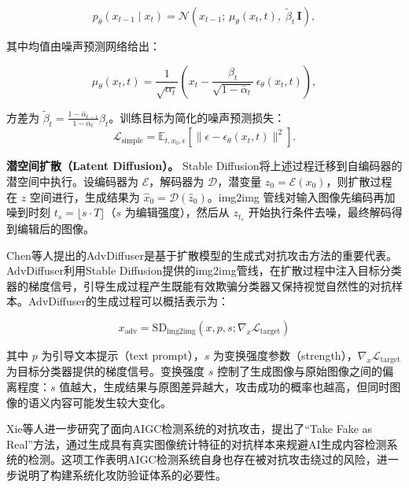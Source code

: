 \documentclass[type=bachelor,oneside]{fduthesis}
\begin{document}
\begin{equation}
  p_\theta(x_{t-1} \mid x_t) = \mathcal{N}\!\left(x_{t-1};\, \mu_\theta(x_t,t),\; \tilde{\beta}_t\, \mathbf{I}\right),
  \label{eq:ddpm_reverse}
\end{equation}

其中均值由噪声预测网络给出：

\begin{equation}
  \mu_\theta(x_t,t)=\frac{1}{\sqrt{\alpha_t}}\!\left(x_t - \frac{\beta_t}{\sqrt{1-\bar{\alpha}_t}}\,\epsilon_\theta(x_t,t)\right),
  \label{eq:ddpm_reverse_mean}
\end{equation}

方差为 $\tilde{\beta}_t = \frac{1-\bar{\alpha}_{t-1}}{1-\bar{\alpha}_t}\beta_t$。训练目标为简化的噪声预测损失：
\begin{equation}
  \mathcal{L}_{\text{simple}} = \mathbb{E}_{t,x_0,\epsilon}\!\left[\|\epsilon - \epsilon_\theta(x_t,t)\|^2\right].
\end{equation}

\textbf{潜空间扩散（Latent Diffusion）。} Stable Diffusion\cite{rombach2022highresolution}将上述过程迁移到自编码器的潜空间中执行。设编码器为 $\mathcal{E}$，解码器为 $\mathcal{D}$，潜变量 $z_0=\mathcal{E}(x_0)$，则扩散过程在 $z$ 空间进行，生成结果为 $\hat{x}_0 = \mathcal{D}(\hat{z}_0)$。img2img 管线对输入图像先编码再加噪到时刻 $t_s=\lfloor s\cdot T\rfloor$（$s$ 为编辑强度），然后从 $z_{t_s}$ 开始执行条件去噪，最终解码得到编辑后的图像。

Chen等人\cite{chen2023advdiffuser}提出的AdvDiffuser是基于扩散模型的生成式对抗攻击方法的重要代表。AdvDiffuser利用Stable Diffusion\cite{rombach2022highresolution}提供的img2img管线，在扩散过程中注入目标分类器的梯度信号，引导生成过程产生既能有效欺骗分类器又保持视觉自然性的对抗样本。AdvDiffuser的生成过程可以概括表示为：

\begin{equation}
  x_{\text{adv}} = \text{SD}_{\text{img2img}}(x, p, s; \nabla_x \mathcal{L}_{\text{target}})
  \label{eq:advdiffuser}
\end{equation}

其中 $p$ 为引导文本提示（text prompt），$s$ 为变换强度参数（strength），$\nabla_x \mathcal{L}_{\text{target}}$ 为目标分类器提供的梯度信号。变换强度 $s$ 控制了生成图像与原始图像之间的偏离程度：$s$ 值越大，生成结果与原图差异越大，攻击成功的概率也越高，但同时图像的语义内容可能发生较大变化。

Xie等人\cite{xie2025takefake}进一步研究了面向AIGC检测系统的对抗攻击，提出了“Take Fake as Real”方法，通过生成具有真实图像统计特征的对抗样本来规避AI生成内容检测系统的检测。这项工作表明AIGC检测系统自身也存在被对抗攻击绕过的风险，进一步说明了构建系统化攻防验证体系的必要性。
\end{document}
